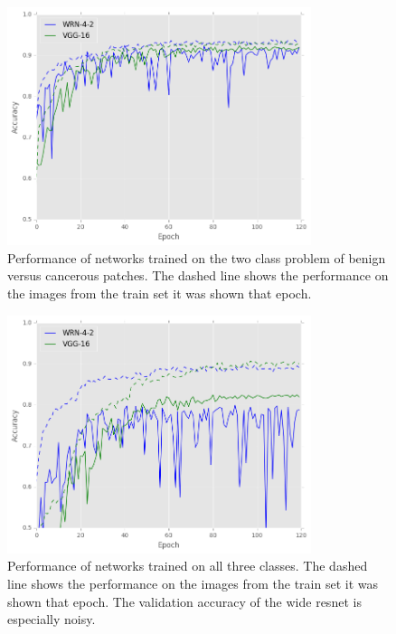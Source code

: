 \documentclass[journal]{IEEEtran}
\begin{document}
\begin{figure}[!t]
\centering{}
\hspace{-0.3cm}\includegraphics[width=3.5in]{2class_performance}
\caption{Performance of networks trained on the two class problem of benign versus cancerous patches. The dashed line shows the performance on the images from the train set it was shown that epoch.}
\label{fig_2class}
\end{figure}

\begin{figure}[!t]
\centering{}
\hspace{-0.3cm}\includegraphics[width=3.5in]{3class_performance}
\caption{Performance of networks trained on all three classes. The dashed line shows the performance on the images from the train set it was shown that epoch. The validation accuracy of the wide resnet is especially noisy.}
\label{fig_3class}
\end{figure}



\end{document}
